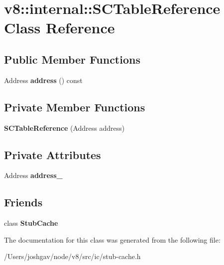 \hypertarget{classv8_1_1internal_1_1_s_c_table_reference}{}\section{v8\+:\+:internal\+:\+:S\+C\+Table\+Reference Class Reference}
\label{classv8_1_1internal_1_1_s_c_table_reference}
\subsection*{Public Member Functions}
\begin{DoxyCompactItemize}
\item 
Address {\bfseries address} () const \hypertarget{classv8_1_1internal_1_1_s_c_table_reference_a9ef72f9ebe8c83cf2706d426b8cb942e}{}\label{classv8_1_1internal_1_1_s_c_table_reference_a9ef72f9ebe8c83cf2706d426b8cb942e}

\end{DoxyCompactItemize}
\subsection*{Private Member Functions}
\begin{DoxyCompactItemize}
\item 
{\bfseries S\+C\+Table\+Reference} (Address address)\hypertarget{classv8_1_1internal_1_1_s_c_table_reference_a3d27c68aadf4366d32e8391634559250}{}\label{classv8_1_1internal_1_1_s_c_table_reference_a3d27c68aadf4366d32e8391634559250}

\end{DoxyCompactItemize}
\subsection*{Private Attributes}
\begin{DoxyCompactItemize}
\item 
Address {\bfseries address\+\_\+}\hypertarget{classv8_1_1internal_1_1_s_c_table_reference_adda6883a1d47763a5ba23dda0edf6e4f}{}\label{classv8_1_1internal_1_1_s_c_table_reference_adda6883a1d47763a5ba23dda0edf6e4f}

\end{DoxyCompactItemize}
\subsection*{Friends}
\begin{DoxyCompactItemize}
\item 
class {\bfseries Stub\+Cache}\hypertarget{classv8_1_1internal_1_1_s_c_table_reference_a9dd0864bf7d020620606b5f3e1a0452f}{}\label{classv8_1_1internal_1_1_s_c_table_reference_a9dd0864bf7d020620606b5f3e1a0452f}

\end{DoxyCompactItemize}


The documentation for this class was generated from the following file\+:\begin{DoxyCompactItemize}
\item 
/\+Users/joshgav/node/v8/src/ic/stub-\/cache.\+h\end{DoxyCompactItemize}
